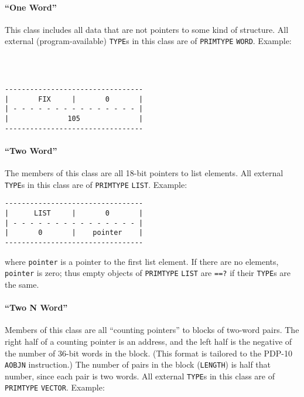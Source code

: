 \documentclass[a4paper,]{article}
\let\oldparagraph\paragraph
\renewcommand{\paragraph}[1]{\oldparagraph{#1}\mbox{}}
\begin{document}
\paragraph{\texorpdfstring{``One Word''}{One Word}}\label{one-word}

This class includes all data that are not pointers to some kind of structure. All external (program-available)
\texttt{TYPE}s in this class are of \texttt{PRIMTYPE} \texttt{WORD}. Example:

\begin{verbatim}



---------------------------------
|       FIX     |       0       |
| - - - - - - - - - - - - - - - |
|              105              |
---------------------------------
\end{verbatim}

\paragraph{\texorpdfstring{``Two Word''}{Two Word}}\label{two-word}

The members of this class are all 18-bit pointers to list elements. All external \texttt{TYPE}s in this class are of
\texttt{PRIMTYPE} \texttt{LIST}. Example:

\begin{verbatim}
---------------------------------
|      LIST     |       0       |
| - - - - - - - - - - - - - - - |
|       0       |    pointer    |
---------------------------------
\end{verbatim}

where \texttt{pointer} is a pointer to the first list element. If there are no elements, \texttt{pointer} is zero; thus
empty objects of \texttt{PRIMTYPE} \texttt{LIST} are \texttt{==?}  if their \texttt{TYPE}s are the
same.

\paragraph{\texorpdfstring{``Two N Word''}{Two N Word}}\label{two-n-word}

Members of this class are all ``counting pointers'' to blocks of two-word pairs. The right half of a counting pointer is an
address, and the left half is the negative of the number of 36-bit words in the block. (This format is tailored to the
PDP-10 \texttt{AOBJN} instruction.) The number of pairs in the block (\texttt{LENGTH}) is half that number, since each pair
is two words. All external \texttt{TYPE}s in this class are of \texttt{PRIMTYPE} \texttt{VECTOR}.
Example:
\end{document}
